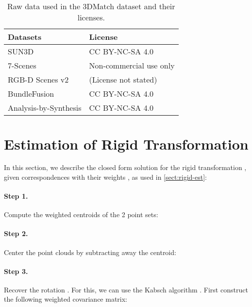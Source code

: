 \documentclass[10pt,twocolumn,letterpaper]{article}
\begin{document}
\begin{table}[hbt]
\small
\centering
\begin{tabularx}{0.95\linewidth}{X | l }
    \hline
    Datasets & License \\
    \hline
    SUN3D \cite{xiao2013sun3d,halber2017fine} & CC BY-NC-SA 4.0 \\
    7-Scenes \cite{shotton2013sevenscene} & Non-commercial use only \\
    RGB-D Scenes v2 \cite{lai2014unsupervised} & (License not stated) \\
    BundleFusion \cite{dai2017bundlefusion} & CC BY-NC-SA 4.0 \\
    Analysis-by-Synthesis \cite{valentin2016analBySyn} & CC BY-NC-SA 4.0 \\
    \hline
\end{tabularx}
\vspace{-1mm}
\caption{Raw data used in the 3DMatch \cite{zeng20163dmatch} dataset and their licenses.}
\label{table:3dmatch-datasets}
\end{table}


\section{Estimation of Rigid Transformation}\label{sect:kabsch}
In this section, we describe the closed form solution for the rigid transformation , given correspondences  with their weights , as used in \cref{sect:rigid-est}:


\vspace{-2mm}
\paragraph{Step 1.} Compute the weighted centroids of the 2 point sets:


\vspace{-2mm}
\paragraph{Step 2.} Center the point clouds by subtracting away the centroid:


\vspace{-2mm}
\paragraph{Step 3.} Recover the rotation . For this, we can use the Kabsch algorithm \cite{kabsch1976svd}. First construct the following  weighted covariance matrix:
\end{document}
